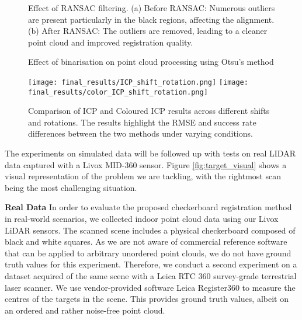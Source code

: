 \begin{figure}[h]
    \centering
    \hfill
    \caption{Effect of RANSAC filtering. (a) Before RANSAC: Numerous outliers are present particularly in the black regions, affecting the alignment. (b) After RANSAC: The outliers are removed, leading to a cleaner point cloud and improved registration quality.}
    \label{fig:ransac_before_after}
\end{figure}

\begin{figure}[h]
    \centering
    \hfill
    \caption{Effect of binarisation on point cloud processing using Otsu's method}
    \label{fig:binarisation}
\end{figure}


\begin{figure*}[h]
  \texttt{[image: final\_results/ICP\_shift\_rotation.png]}
\endminipage\hfill
{}
  \texttt{[image: final\_results/color\_ICP\_shift\_rotation.png]}
\endminipage\hfill

\caption{Comparison of ICP and Coloured ICP results across different shifts and rotations. The results highlight the RMSE and success rate differences between the two methods under varying conditions.}
\label{fig:both_shift_rotation_results}
\end{figure*}

The experiments on simulated data will be followed up with tests on real LIDAR data captured with a Livox MID-360 sensor. Figure \ref{fig:target_visual} shows a visual representation of the problem we are tackling, with the rightmost scan being the most challenging situation. 

\textbf{Real Data} In order to evaluate the proposed checkerboard registration method in real-world scenarios, we collected indoor point cloud data using our Livox LiDAR sensors. The scanned scene includes a physical checkerboard composed of black and white squares. As we are not aware of commercial reference software that can be applied to arbitrary unordered point clouds, we do not have ground truth values for this experiment. Therefore, we conduct a second experiment on a dataset acquired of the same scene with a Leica RTC 360 survey-grade terrestrial laser scanner. We use vendor-provided software Leica Register360 to measure the centres of the targets in the scene. This provides ground truth values, albeit on an ordered and rather noise-free point cloud.

